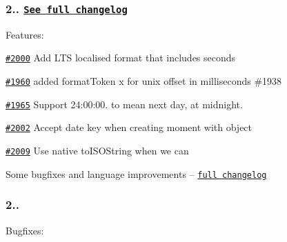 \subsubsection*{2.. \href{https://gist.github.com/ichernev/a4fcb0a46d74e4b9b996}{\tt See full changelog}}

Features\+:


\begin{DoxyItemize}
\item \href{https://github.com/moment/moment/issues/2000}{\tt \#2000} Add L\+TS localised format that includes seconds
\item \href{https://github.com/moment/moment/issues/1960}{\tt \#1960} added format\+Token \textquotesingle{}x\textquotesingle{} for unix offset in milliseconds \#1938
\item \href{https://github.com/moment/moment/issues/1965}{\tt \#1965} Support 24\+:00\+:00. to mean next day, at midnight.
\item \href{https://github.com/moment/moment/issues/2002}{\tt \#2002} Accept \textquotesingle{}date\textquotesingle{} key when creating moment with object
\item \href{https://github.com/moment/moment/issues/2009}{\tt \#2009} Use native to\+I\+S\+O\+String when we can
\end{DoxyItemize}

Some bugfixes and language improvements -- \href{https://gist.github.com/ichernev/a4fcb0a46d74e4b9b996}{\tt full changelog}

\subsubsection*{2..}

Bugfixes\+:


